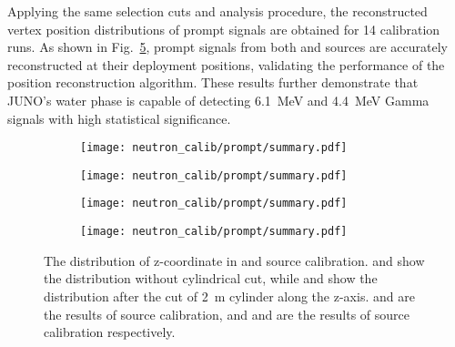 Applying the same selection cuts and analysis procedure, the reconstructed vertex position distributions of prompt signals are obtained for 14 calibration runs.
As shown in Fig.~\ref{fig:promptSummary}, prompt signals from both  and  sources are accurately reconstructed at their deployment positions, validating the performance of the position reconstruction algorithm.
These results further demonstrate that JUNO's water phase is capable of detecting \SI{6.1}{MeV} and \SI{4.4}{MeV} Gamma signals with high statistical significance.
\begin{figure}[htbp]
	\centering
	\begin{subfigure}{0.5\textwidth}
		\centering
		\texttt{[image: neutron\_calib/prompt/summary.pdf]}
		\caption{}
		\label{fig:AmC_all}
	\end{subfigure}%
	\begin{subfigure}{0.5\textwidth}
		\centering
		\texttt{[image: neutron\_calib/prompt/summary.pdf]}
		\caption{}
		\label{fig:AmC_2m}
	\end{subfigure}
	\begin{subfigure}{0.5\textwidth}
		\centering
		\texttt{[image: neutron\_calib/prompt/summary.pdf]}
		\caption{}
		\label{fig:AmBe_all}
	\end{subfigure}%
	\begin{subfigure}{0.5\textwidth}
		\centering
		\texttt{[image: neutron\_calib/prompt/summary.pdf]}
		\caption{}
		\label{fig:AmBe_2m}
	\end{subfigure}
	\caption{The distribution of z-coordinate in  and  source calibration.  and  show the distribution without cylindrical cut, while  and  show the distribution after the cut of \SI{2}{m} cylinder along the z-axis.  and  are the results of  source calibration, and  and  are the results of  source calibration respectively.}
	\label{fig:promptSummary}
\end{figure}

